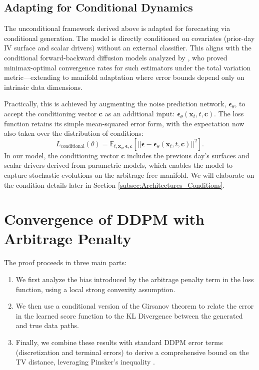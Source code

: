 \documentclass{article}
\begin{document}
\subsection{Adapting for Conditional Dynamics}
The unconditional framework derived above is adapted for forecasting via conditional generation. The model is directly conditioned on covariates (prior-day IV surface and scalar drivers) without an external classifier. This aligns with the conditional forward-backward diffusion models analyzed by \citet{Tang_Lin_Yang_2024}, who proved minimax-optimal convergence rates for such estimators under the total variation metric—extending to manifold adaptation where error bounds depend only on intrinsic data dimensions.

Practically, this is achieved by augmenting the noise prediction network, $\boldsymbol{\epsilon}_\theta$, to accept the conditioning vector $\mathbf{c}$ as an additional input: $\boldsymbol{\epsilon}_\theta(\mathbf{x}_t, t, \mathbf{c})$. The loss function retains its simple mean-squared error form, with the expectation now also taken over the distribution of conditions:
$$
L_{\text{conditional}}(\theta) = \mathbb{E}_{t, \mathbf{x}_0, \boldsymbol{\epsilon}, \mathbf{c}} \left[ || \boldsymbol{\epsilon} - \boldsymbol{\epsilon}_\theta(\mathbf{x}_t, t, \mathbf{c}) ||^2 \right].
$$
In our model, the conditioning vector $\mathbf{c}$ includes the previous day's surfaces and scalar drivers derived from parametric models, which enables the model to capture stochastic evolutions on the arbitrage-free manifold. We will elaborate on the condition details later in Section \ref{subsec:Architectures_Conditions}.



\section{Convergence of DDPM with Arbitrage Penalty}
\label{sec:convergence}
The proof proceeds in three main parts:
\begin{enumerate}
    \item We first analyze the bias introduced by the arbitrage penalty term in the loss function, using a local strong convexity assumption.
    \item We then use a conditional version of the Girsanov theorem to relate the error in the learned score function to the KL Divergence between the generated and true data paths.
    \item Finally, we combine these results with standard DDPM error terms (discretization and terminal errors) to derive a comprehensive bound on the TV distance, leveraging Pinsker's inequality \citep{chen2025diffusionfactormodelsgenerating, Tsybakov_2009}.
\end{enumerate}
\end{document}
